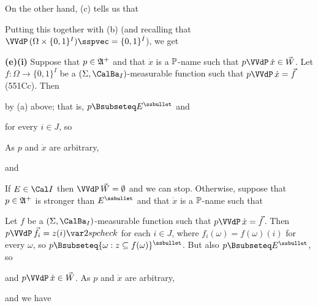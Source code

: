 {

\noindent On the other hand, (c) tells us that


Putting this together with (b) (and recalling that
$\VVdP\,(\Omega\times\{0,1\}^I)\sspvec=\{0,1\}^{\check I}$), we get


\medskip

{\bf (e)(i)} Suppose that $p\in\frak A^+$ and that $\dot x$ is a
$\Bbb P$-name such that $p\VVdP\,\dot x\in\vec W$.
Let $f:\Omega\to\{0,1\}^I$ be
a $(\Sigma,\CalBa_I)$-measurable function such that
$p\VVdP\,\dot x=\vec f$ (551Cc).   Then


\noindent by (a) above;  that is, $p\Bsubseteq E^{\ssbullet}$ and


\noindent for every $i\in J$, so


\noindent As $p$ and $\dot x$ are arbitrary,


\noindent and



 If $E\in\Cal I$ then
$\VVdP\,\vec W=\emptyset$ and we can stop.
Otherwise, suppose that $p\in\frak A^+$ is stronger than
$E^{\ssbullet}$ and that $\dot x$ is a $\Bbb P$-name such that


\noindent Let $f$ be a $(\Sigma,\CalBa_I)$-measurable function such that
$p\VVdP\,\dot x=\vec f$.   Then $p\VVdP\,\vec f_i=z(i)\var2spcheck$
for each $i\in J$, where $f_i(\omega)=f(\omega)(i)$ for every $\omega$, so
$p\Bsubseteq\{\omega:z\subseteq f(\omega)\}^{\ssbullet}$.   But also
$p\Bsubseteq E^{\ssbullet}$, so


\noindent and $p\VVdP\,\dot x\in\vec W$.   As $p$ and
$\dot x$ are arbitrary,


\noindent and we have

}%

